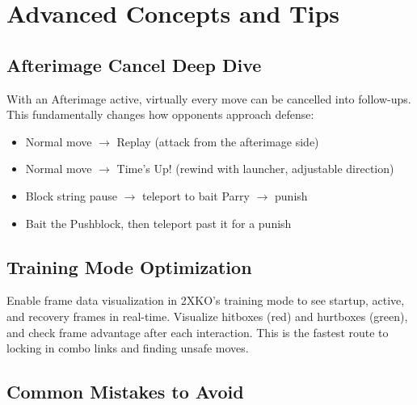 \documentclass[12pt, a4paper]{report}
\begin{document}
\chapter{Advanced Concepts and Tips}

\section{Afterimage Cancel Deep Dive}

With an Afterimage active, virtually every move can be cancelled into follow-ups. This fundamentally changes how opponents approach defense:

\begin{itemize}
  \item Normal move $\to$ Replay (attack from the afterimage side)
  \item Normal move $\to$ Time's Up! (rewind with launcher, adjustable direction)
  \item Block string pause $\to$ teleport to bait Parry $\to$ punish
  \item Bait the Pushblock, then teleport past it for a punish
\end{itemize}

\section{Training Mode Optimization}

\begin{tipbox}
Enable frame data visualization in 2XKO's training mode to see startup, active, and recovery frames in real-time. Visualize hitboxes (red) and hurtboxes (green), and check frame advantage after each interaction. This is the fastest route to locking in combo links and finding unsafe moves.
\end{tipbox}

\section{Common Mistakes to Avoid}
\end{document}
